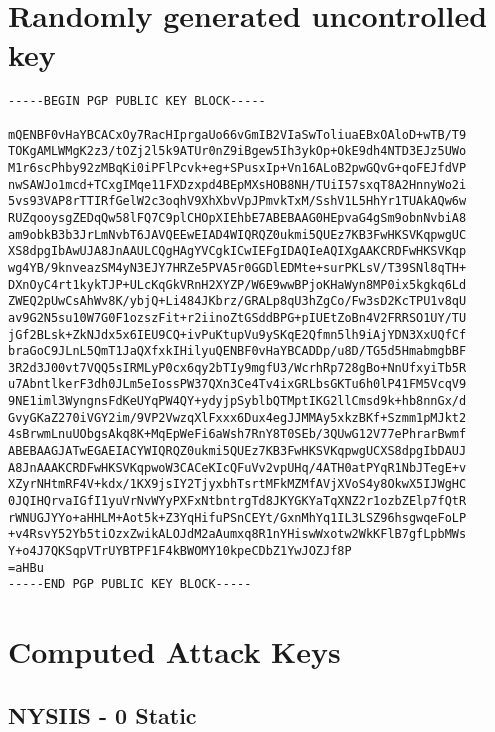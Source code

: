 \appendix

\chapter{Randomly generated uncontrolled key}
\label{appendix:uncontrolled_key}

\begin{lstlisting}
-----BEGIN PGP PUBLIC KEY BLOCK-----

mQENBF0vHaYBCACxOy7RacHIprgaUo66vGmIB2VIaSwToliuaEBxOAloD+wTB/T9
TOKgAMLWMgK2z3/tOZj2l5k9ATUr0nZ9iBgew5Ih3ykOp+OkE9dh4NTD3EJz5UWo
M1r6scPhby92zMBqKi0iPFlPcvk+eg+SPusxIp+Vn16ALoB2pwGQvG+qoFEJfdVP
nwSAWJo1mcd+TCxgIMqe11FXDzxpd4BEpMXsHOB8NH/TUiI57sxqT8A2HnnyWo2i
5vs93VAP8rTTIRfGelW2c3oqhV9XhXbvVpJPmvkTxM/SshV1L5HhYr1TUAkAQw6w
RUZqooysgZEDqQw58lFQ7C9plCHOpXIEhbE7ABEBAAG0HEpvaG4gSm9obnNvbiA8
am9obkB3b3JrLmNvbT6JAVQEEwEIAD4WIQRQZ0ukmi5QUEz7KB3FwHKSVKqpwgUC
XS8dpgIbAwUJA8JnAAULCQgHAgYVCgkICwIEFgIDAQIeAQIXgAAKCRDFwHKSVKqp
wg4YB/9knveazSM4yN3EJY7HRZe5PVA5r0GGDlEDMte+surPKLsV/T39SNl8qTH+
DXnOyC4rt1kykTJP+ULcKqGkVRnH2XYZP/W6E9wwBPjoKHaWyn8MP0ix5kgkq6Ld
ZWEQ2pUwCsAhWv8K/ybjQ+Li484JKbrz/GRALp8qU3hZgCo/Fw3sD2KcTPU1v8qU
av9G2N5su10W7G0F1ozszFit+r2iinoZtGSddBPG+pIUEtZoBn4V2FRRSO1UY/TU
jGf2BLsk+ZkNJdx5x6IEU9CQ+ivPuKtupVu9ySKqE2Qfmn5lh9iAjYDN3XxUQfCf
braGoC9JLnL5QmT1JaQXfxkIHilyuQENBF0vHaYBCADDp/u8D/TG5d5HmabmgbBF
3R2d3J00vt7VQQ5sIRMLyP0cx6qy2bTIy9mgfU3/WcrhRp728gBo+NnUfxyiTb5R
u7AbntlkerF3dh0JLm5eIossPW37QXn3Ce4Tv4ixGRLbsGKTu6h0lP41FM5VcqV9
9NE1iml3WyngnsFdKeUYqPW4QY+ydyjpSyblbQTMptIKG2llCmsd9k+hb8nnGx/d
GvyGKaZ270iVGY2im/9VP2VwzqXlFxxx6Dux4egJJMMAy5xkzBKf+Szmm1pMJkt2
4sBrwmLnuUObgsAkq8K+MqEpWeFi6aWsh7RnY8T0SEb/3QUwG12V77ePhrarBwmf
ABEBAAGJATwEGAEIACYWIQRQZ0ukmi5QUEz7KB3FwHKSVKqpwgUCXS8dpgIbDAUJ
A8JnAAAKCRDFwHKSVKqpwoW3CACeKIcQFuVv2vpUHq/4ATH0atPYqR1NbJTegE+v
XZyrNHtmRF4V+kdx/1KX9jsIY2TjyxbhTsrtMFkMZMfAVjXVoS4y8OkwX5IJWgHC
0JQIHQrvaIGfI1yuVrNvWYyPXFxNtbntrgTd8JKYGKYaTqXNZ2r1ozbZElp7fQtR
rWNUGJYYo+aHHLM+Aot5k+Z3YqHifuPSnCEYt/GxnMhYq1IL3LSZ96hsgwqeFoLP
+v4RsvY52Yb5tiOzxZwikALOJdM2aAumxq8R1nYHiswWxotw2WkKFlB7gfLpbMWs
Y+o4J7QKSqpVTrUYBTPF1F4kBWOMY10kpeCDbZ1YwJOZJf8P
=aHBu
-----END PGP PUBLIC KEY BLOCK-----
\end{lstlisting}

\chapter{Computed Attack Keys}

\section{NYSIIS - 0 Static}
\label{appendix:nysiis_0_static}

